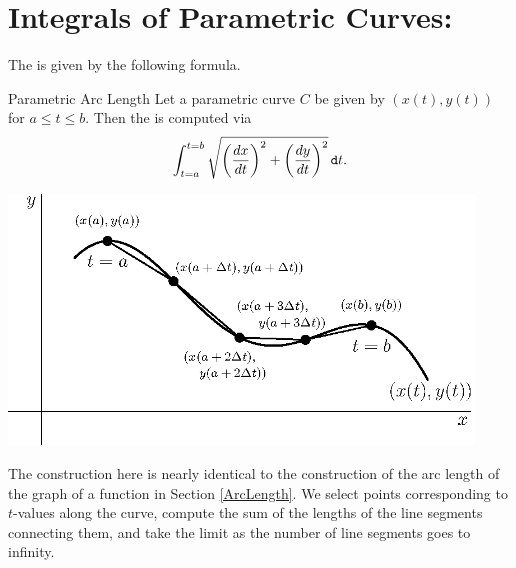 \section{Integrals of Parametric Curves: }

The  is given by the following formula.

\begin{theorem}{Parametric Arc Length }
Let a parametric curve $C$ be given by $\left(x(t),y(t) \right)$ for $a\leq t \leq b$.  Then the  is computed via $$\int_{t=a}^{t=b}\sqrt{\left(\frac{dx}{dt}\right)^2+\left(\frac{dy}{dt}\right)^2} \mathop{}\!\mathtt{d} t.$$
\end{theorem}

	\begin{center}
		\includegraphics[width=350pt]{ChapterCalcIII/Figures/paraarclength.eps}
	\end{center}

The construction here is nearly identical to the construction of the arc length of the graph of a function in Section \ref{ArcLength}.  We select points corresponding to $t$-values along the curve, compute the sum of the lengths of the line segments connecting them, and take the limit as the number of line segments goes to infinity.

